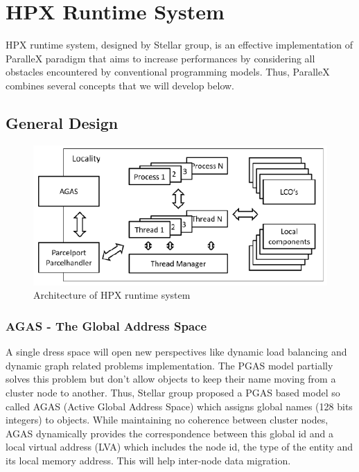 \documentclass{llncs}
\begin{document}
\section{HPX Runtime System}\label{HPX}
HPX runtime system, designed by Stellar group, is an effective implementation
of ParalleX paradigm that aims to increase performances by considering all
obstacles encountered by conventional programming models. Thus, ParalleX
combines several concepts that we will develop below.

\subsection{General Design}

\begin{figure}[h]
\begin{center}
\includegraphics[scale=0.55]{Images/Im4.png}
\end{center}
\caption{Architecture of HPX runtime system}
\label{ArchiHPX}
\end{figure}

\subsubsection{AGAS - The Global Address Space}
A single dress space will open new perspectives like dynamic load balancing
and dynamic graph related problems implementation. The PGAS model \cite{PGAS}
partially solves this problem but don't allow objects to keep their name moving
from a cluster node to another. Thus, Stellar group proposed a PGAS based model
so called AGAS (Active Global Address Space) \cite{ParalleX} which assigns
global names (128 bits integers) to objects. While maintaining no coherence
between cluster nodes, AGAS dynamically provides the correspondence between
this global id and a local virtual address (LVA) \cite{ParalleX} which includes
the node id, the type of the entity and its local memory address. This will
help inter-node data migration.
\end{document}
